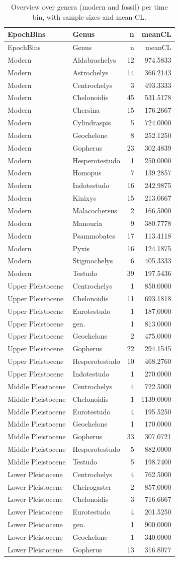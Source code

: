 \documentclass[]{article}
\begin{document}
\begin{longtable}[]{@{}llrr@{}}
\caption{Overview over genera (modern and fossil) per time bin, with
sample sizes and mean CL.}\tabularnewline
\toprule
EpochBins & Genus & n & meanCL\tabularnewline
\midrule
\endfirsthead
\toprule
EpochBins & Genus & n & meanCL\tabularnewline
\midrule
\endhead
Modern & Aldabrachelys & 12 & 974.5833\tabularnewline
Modern & Astrochelys & 14 & 366.2143\tabularnewline
Modern & Centrochelys & 3 & 493.3333\tabularnewline
Modern & Chelonoidis & 45 & 531.5178\tabularnewline
Modern & Chersina & 15 & 176.2667\tabularnewline
Modern & Cylindraspis & 5 & 724.0000\tabularnewline
Modern & Geochelone & 8 & 252.1250\tabularnewline
Modern & Gopherus & 23 & 302.4839\tabularnewline
Modern & Hesperotestudo & 1 & 250.0000\tabularnewline
Modern & Homopus & 7 & 139.2857\tabularnewline
Modern & Indotestudo & 16 & 242.9875\tabularnewline
Modern & Kinixys & 15 & 213.0667\tabularnewline
Modern & Malacochersus & 2 & 166.5000\tabularnewline
Modern & Manouria & 9 & 380.7778\tabularnewline
Modern & Psammobates & 17 & 113.4118\tabularnewline
Modern & Pyxis & 16 & 124.1875\tabularnewline
Modern & Stigmochelys & 6 & 405.3333\tabularnewline
Modern & Testudo & 39 & 197.5436\tabularnewline
Upper Pleistocene & Centrochelys & 1 & 850.0000\tabularnewline
Upper Pleistocene & Chelonoidis & 11 & 693.1818\tabularnewline
Upper Pleistocene & Eurotestudo & 1 & 187.0000\tabularnewline
Upper Pleistocene & gen. & 1 & 813.0000\tabularnewline
Upper Pleistocene & Geochelone & 2 & 475.0000\tabularnewline
Upper Pleistocene & Gopherus & 22 & 294.1545\tabularnewline
Upper Pleistocene & Hesperotestudo & 10 & 468.2760\tabularnewline
Upper Pleistocene & Indotestudo & 1 & 270.0000\tabularnewline
Middle Pleistocene & Centrochelys & 4 & 722.5000\tabularnewline
Middle Pleistocene & Chelonoidis & 1 & 1139.0000\tabularnewline
Middle Pleistocene & Eurotestudo & 4 & 195.5250\tabularnewline
Middle Pleistocene & Geochelone & 1 & 170.0000\tabularnewline
Middle Pleistocene & Gopherus & 33 & 307.0721\tabularnewline
Middle Pleistocene & Hesperotestudo & 5 & 882.0000\tabularnewline
Middle Pleistocene & Testudo & 5 & 198.7400\tabularnewline
Lower Pleistocene & Centrochelys & 4 & 762.5000\tabularnewline
Lower Pleistocene & Cheirogaster & 2 & 857.0000\tabularnewline
Lower Pleistocene & Chelonoidis & 3 & 716.6667\tabularnewline
Lower Pleistocene & Eurotestudo & 4 & 201.5250\tabularnewline
Lower Pleistocene & gen. & 1 & 900.0000\tabularnewline
Lower Pleistocene & Geochelone & 1 & 340.0000\tabularnewline
Lower Pleistocene & Gopherus & 13 & 316.8077\tabularnewline

\end{longtable}
\end{document}
